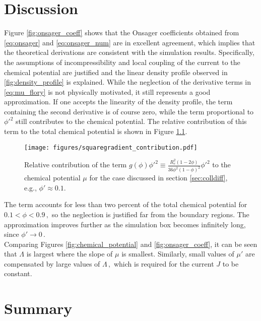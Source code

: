 \documentclass[bachelor,       %
               twoside,        %
               BCOR10mm,       %
                ngerman,english  %
               ]{GAUBM}
\begin{document}
\chapter{Discussion}
\label{chap:discussion}

Figure \ref{fig:onsager_coeff} shows that the Onsager coefficients obtained from \eqref{eq:onsager} and \eqref{eq:onsager_num} are in excellent agreement, which implies that the theoretical derivations are consistent with the simulation results. Specifically, the assumptions of incompressibility and local coupling of the current to the chemical potential are justified and the linear density profile observed in \ref{fig:density_profile} is explained. While the neglection of the derivative terms in \eqref{eq:mu_flory} is not physically motivated, it still represents a good approximation. If one accepts the linearity of the density profile, the term containing the second derivative is of course zero, while the term proportional to $\phi'^2$ still contributes to the chemical potential. The relative contribution of this term to the total chemical potential is shown in  Figure \ref{fig:squaregradient_contribution}. 


\begin{figure}[h]
  \centering
  \texttt{[image: figures/squaregradient\_contribution.pdf]}
  \caption{Relative contribution of the term $g(\phi)\phi'^2\equiv\frac{R_e^2(1-2\phi)}{36\phi^2(1-\phi)^2}\phi'^2$ to the chemical potential $\mu$ for the case discussed in section \ref{sec:colldiff}, e.g., $\phi'\approx 0.1$. }
  \label{fig:squaregradient_contribution}
\end{figure}

The term accounts for less than two percent of the total chemical potential for $0.1<\phi<0.9\,,$ so the neglection is justified far from the boundary regions. The approximation improves further as the simulation box becomes infinitely long, since $\phi'\rightarrow0\,.$\\
Comparing Figures \ref{fig:chemical_potential} and \ref{fig:onsager_coeff}, it can be seen that $\Lambda$ is largest where the slope of $\mu$ is smallest. Similarly, small values of $\mu'$ are compensated by large values of $\Lambda\,,$ which is required for the current $J$ to be constant.



\chapter{Summary}
\end{document}
